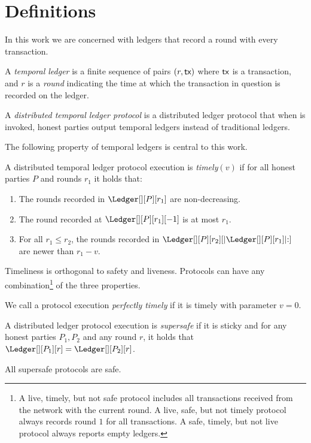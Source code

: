 \section{Definitions}\label{sec:defs}

In this work we are concerned with ledgers that
record a round with every transaction.

\begin{definition}
  A \emph{temporal ledger} is a finite sequence of pairs $(r, \textsf{tx})$ where $\textsf{tx}$ is
  a transaction, and $r$ is a \emph{round} indicating the time at which
  the transaction in question is recorded on the ledger.
\end{definition}

\begin{definition}
  A \emph{distributed temporal ledger protocol} is a distributed ledger protocol
  that when \rread is invoked, honest parties output temporal ledgers instead of traditional ledgers.
\end{definition}

The following property of temporal ledgers is central to this work.

\begin{definition}[Timely]\label{def:timely}
  A distributed temporal ledger protocol execution is \emph{timely}$(v)$
  if for all honest parties $P$ and rounds $r_1$ it holds that:

  \begin{enumerate}
    \item The rounds recorded in $\Ledger[][P][r_1]$ are non-decreasing.\label{def:timely-increasing}
    \item The round recorded at $\Ledger[][P][r_1][-1]$ is at most $r_1$.\label{def:timely-past}
    \item For all $r_1 \leq r_2$, the rounds recorded in $\Ledger[][P][r_2][|\Ledger[][P][r_1]|{:}]$ are
          newer than $r_1 - v$.\label{def:timely-chunk}
  \end{enumerate}
\end{definition}

Timeliness is orthogonal to safety and liveness. Protocols can have any
combination\footnote{A live, timely, but not safe protocol includes all transactions
received from the network with the current round.
A live, safe, but not timely protocol always records round $1$ for all transactions.
A safe, timely, but not live protocol always reports empty ledgers.}
of the three properties.

\begin{definition}
  We call a protocol execution \emph{perfectly timely} if it is timely with parameter $v = 0$.
\end{definition}

\begin{definition}[Supersafety]
  A distributed ledger protocol execution is \emph{supersafe} if it is sticky and
  for any honest parties $P_1, P_2$ and any round $r$, it holds that
  $\Ledger[][P_1][r] = \Ledger[][P_2][r]$.
\end{definition}

All supersafe protocols are safe.
